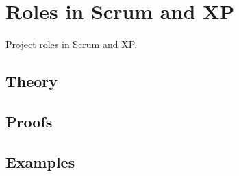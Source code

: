 
\section{Roles in Scrum and XP}
\label{sec:2.6.07-scrum-xp-roles}

\begin{ticket}
Project roles in Scrum and XP.
\end{ticket}

\subsection*{Theory}

\subsection*{Proofs}

\subsection*{Examples}
